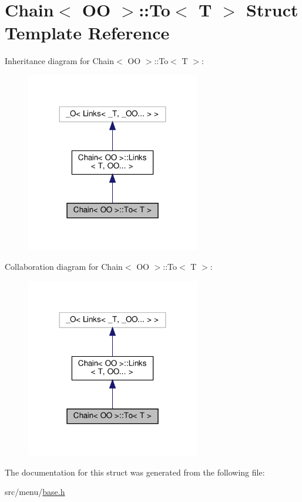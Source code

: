 \hypertarget{structChain_1_1To}{}\section{Chain$<$ OO $>$\+:\+:To$<$ T $>$ Struct Template Reference}
\label{structChain_1_1To}


Inheritance diagram for Chain$<$ OO $>$\+:\+:To$<$ T $>$\+:\nopagebreak
\begin{figure}[H]
\begin{center}
\leavevmode
\includegraphics[width=215pt]{structChain_1_1To__inherit__graph}
\end{center}
\end{figure}


Collaboration diagram for Chain$<$ OO $>$\+:\+:To$<$ T $>$\+:\nopagebreak
\begin{figure}[H]
\begin{center}
\leavevmode
\includegraphics[width=215pt]{structChain_1_1To__coll__graph}
\end{center}
\end{figure}


The documentation for this struct was generated from the following file\+:\begin{DoxyCompactItemize}
\item 
src/menu/\hyperlink{base_8h}{base.\+h}\end{DoxyCompactItemize}
